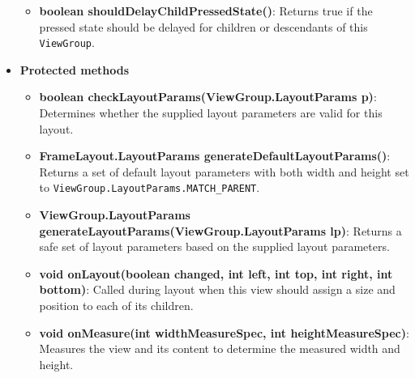 \documentclass{report}
\begin{document}
\begin{itemize}
\begin{itemize}
                \item \textbf{boolean shouldDelayChildPressedState()}: Returns true if the pressed state should be delayed for children or descendants of this \texttt{ViewGroup}.
            \end{itemize}
        \item \textbf{Protected methods}
            \begin{itemize}
                \item \textbf{boolean checkLayoutParams(ViewGroup.LayoutParams p)}: Determines whether the supplied layout parameters are valid for this layout.
                \item \textbf{FrameLayout.LayoutParams generateDefaultLayoutParams()}: Returns a set of default layout parameters with both width and height set to \texttt{ViewGroup.LayoutParams.MATCH\_PARENT}.
                \item \textbf{ViewGroup.LayoutParams generateLayoutParams(ViewGroup.LayoutParams lp)}: Returns a safe set of layout parameters based on the supplied layout parameters.
                \item \textbf{void onLayout(boolean changed, int left, int top, int right, int bottom)}: Called during layout when this view should assign a size and position to each of its children.
                \item \textbf{void onMeasure(int widthMeasureSpec, int heightMeasureSpec)}: Measures the view and its content to determine the measured width and height.
            \end{itemize}

        
    \end{itemize}

    \pagebreak 
\end{document}

